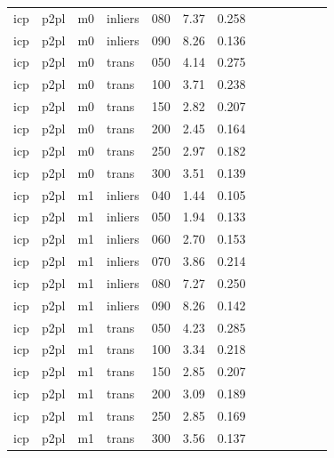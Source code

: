 \begin{table}[htbp]
\begin{tabular}{lllllrrrrrrrr}
  icp & p2pl & m0 & inliers & 080 & 7.37 & 0.258 \\
  icp & p2pl & m0 & inliers & 090 & 8.26 & 0.136 \\
  icp & p2pl & m0 & trans & 050 & 4.14 & 0.275 \\
  icp & p2pl & m0 & trans & 100 & 3.71 & 0.238 \\
  icp & p2pl & m0 & trans & 150 & 2.82 & 0.207 \\
  icp & p2pl & m0 & trans & 200 & 2.45 & 0.164 \\
  icp & p2pl & m0 & trans & 250 & 2.97 & 0.182 \\
  icp & p2pl & m0 & trans & 300 & 3.51 & 0.139 \\
  icp & p2pl & m1 & inliers & 040 & 1.44 & 0.105 \\
  icp & p2pl & m1 & inliers & 050 & 1.94 & 0.133 \\
  icp & p2pl & m1 & inliers & 060 & 2.70 & 0.153 \\
  icp & p2pl & m1 & inliers & 070 & 3.86 & 0.214 \\
  icp & p2pl & m1 & inliers & 080 & 7.27 & 0.250 \\
  icp & p2pl & m1 & inliers & 090 & 8.26 & 0.142 \\
  icp & p2pl & m1 & trans & 050 & 4.23 & 0.285 \\
  icp & p2pl & m1 & trans & 100 & 3.34 & 0.218 \\
  icp & p2pl & m1 & trans & 150 & 2.85 & 0.207 \\
  icp & p2pl & m1 & trans & 200 & 3.09 & 0.189 \\
  icp & p2pl & m1 & trans & 250 & 2.85 & 0.169 \\
  icp & p2pl & m1 & trans & 300 & 3.56 & 0.137 \\
\bottomrule
\end{tabular}
\end{table}
